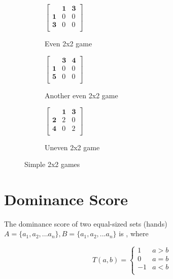 \documentclass[11pt, oneside]{article} 	%
\begin{document}
\begin{figure}
\centering
\begin{subfigure}{.5\textwidth}
  \centering
$ \left[\begin{array}{ccc}
                        & \mathbf{1} & \mathbf{3}\\ 
                       \mathbf{1} & 0 & 0\\
                        \mathbf{3} & 0 & 0\\
                      \end{array}\right] 
$
  \caption{Even 2x2 game}
\label{fig:even_2x2}
\end{subfigure}

\begin{subfigure}{.5\textwidth}
  \centering
$ \left[\begin{array}{ccc}
                        & \mathbf{3} & \mathbf{4}\\ 
                       \mathbf{1} & 0 & 0\\
                        \mathbf{5} & 0 & 0\\
                      \end{array}\right] 
$
  \caption{Another even 2x2 game}
\label{fig:another_even_2x2}
\end{subfigure}

\begin{subfigure}{.5\textwidth}
  \centering
$ \left[\begin{array}{ccc}
                        & \mathbf{1} & \mathbf{3}\\ 
                       \mathbf{2} & 2 & 0\\
                        \mathbf{4} & 0 & 2\\
                      \end{array}\right] 
$
  \caption{Uneven 2x2 game}
\label{fig:uneven_2x2}
\end{subfigure}
\caption{Simple 2x2 games}
\label{fig:2x2}
\end{figure}


\section{Dominance Score}

The dominance score of two equal-sized sets (hands) $A = \{a_1, a_2, ... a_n\}, B =  \{a_1, a_2, ... a_n\}$ is  , where	

\[   
T(a,b) = 
     \begin{cases}
       1 & a > b\\
       0 & a = b \\
       -1 & a < b \\ 
     \end{cases}
\]
\end{document}
